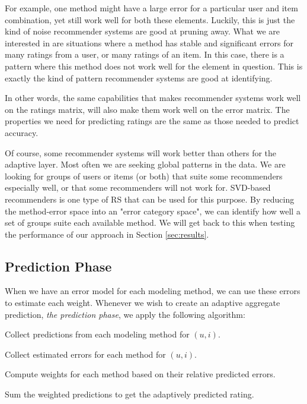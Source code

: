 For example, one method might have a large error for a particular user and item combination,
yet still work well for both these elements. 
Luckily, this is 
just the kind of noise recommender systems are good at pruning away.
What we are interested in are situations where a method
has stable and significant errors for many ratings from a user,
or many ratings of an item.
In this case, there is a pattern where this method does not 
work well for the element in question.
This is exactly the kind of pattern recommender systems are good at identifying.

In other words, the same capabilities that makes recommender systems work well
on the ratings matrix, will also make them work well on the error matrix.
The properties we need for predicting ratings
are the same as those needed to predict accuracy.

Of course, some recommender systems will work better than others for the adaptive layer.
Most often we are seeking global patterns in the data.
We are looking for groups of users or items (or both) that suite some 
recommenders especially well, or that some recommenders will not work for.
SVD-based recommenders is one type of RS that can be used for this purpose.
By reducing the method-error space into an "error category space",
we can identify how well a set of groups suite each available method.
We will get back to this when testing the performance
of our approach in Section \ref{sec:results}.


\subsection{Prediction Phase}

When we have an error model for each modeling method, 
we can use these errors to estimate each weight.
Whenever we wish to create an adaptive aggregate prediction,
\emph{the prediction phase},
we apply the following algorithm:

\begin{enumerate*}
  \item Collect predictions from each modeling method for $(u,i)$.
  \item Collect estimated errors for each method for $(u,i)$.
  \item Compute weights for each method based on their relative predicted errors.
  \item Sum the weighted predictions to get the adaptively predicted rating.
\end{enumerate*}

